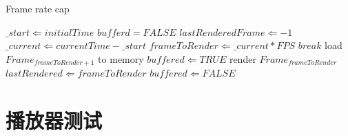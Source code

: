 \begin{algorithm}
\caption{Frame rate cap}
\label{algo:frameratecap}
\begin{algorithmic}[1]
	\STATE $\_start \Leftarrow initialTime$ %
	\STATE $bufferd = FALSE$
	\STATE $lastRenderedFrame \Leftarrow -1$
		\STATE $\_current \Leftarrow currentTime - \_start$ %
		\STATE $frameToRender \Leftarrow \_current * FPS$ %
			\STATE $break$ 
		\ENDIF
			\STATE load $Frame_{frameToRender+1}$ to memory
			\STATE $buffered \Leftarrow TRUE$
		\ENDIF
			\STATE render $Frame_{frameToRender}$
			\STATE $lastRendered \Leftarrow frameToRender$
			\STATE $buffered \Leftarrow FALSE$
		\ENDIF
	\ENDWHILE
\end{algorithmic}
\end{algorithm}

\section{播放器测试}
\label{sec:3dplayerdemo}


